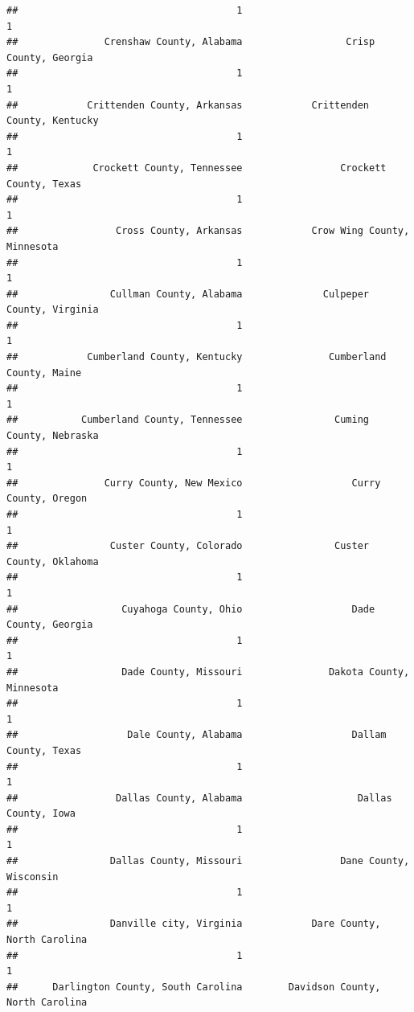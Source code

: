 \documentclass[
]{article}
\begin{document}
\begin{verbatim}
##                                      1                                      1 
##               Crenshaw County, Alabama                  Crisp County, Georgia 
##                                      1                                      1 
##            Crittenden County, Arkansas            Crittenden County, Kentucky 
##                                      1                                      1 
##             Crockett County, Tennessee                 Crockett County, Texas 
##                                      1                                      1 
##                 Cross County, Arkansas            Crow Wing County, Minnesota 
##                                      1                                      1 
##                Cullman County, Alabama              Culpeper County, Virginia 
##                                      1                                      1 
##            Cumberland County, Kentucky               Cumberland County, Maine 
##                                      1                                      1 
##           Cumberland County, Tennessee                Cuming County, Nebraska 
##                                      1                                      1 
##               Curry County, New Mexico                   Curry County, Oregon 
##                                      1                                      1 
##                Custer County, Colorado                Custer County, Oklahoma 
##                                      1                                      1 
##                  Cuyahoga County, Ohio                   Dade County, Georgia 
##                                      1                                      1 
##                  Dade County, Missouri               Dakota County, Minnesota 
##                                      1                                      1 
##                   Dale County, Alabama                   Dallam County, Texas 
##                                      1                                      1 
##                 Dallas County, Alabama                    Dallas County, Iowa 
##                                      1                                      1 
##                Dallas County, Missouri                 Dane County, Wisconsin 
##                                      1                                      1 
##                Danville city, Virginia            Dare County, North Carolina 
##                                      1                                      1 
##      Darlington County, South Carolina        Davidson County, North Carolina 

\end{verbatim}
\end{document}
